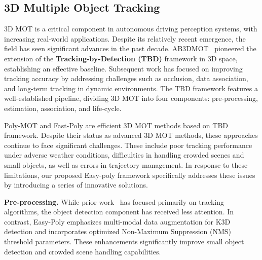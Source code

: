 
\subsection{3D Multiple Object Tracking}

3D MOT is a critical component in autonomous driving perception systems, with increasing real-world applications. Despite its relatively recent emergence, the field has seen significant advances in the past decade. AB3DMOT~\cite{weng20203d} pioneered the extension of the \textbf{Tracking-by-Detection (TBD)} framework in 3D space, establishing an effective baseline. Subsequent work has focused on improving tracking accuracy by addressing challenges such as occlusion, data association, and long-term tracking in dynamic environments. The TBD framework features a well-established pipeline, dividing 3D MOT into four components: pre-processing, estimation, association, and life-cycle.

Poly-MOT and Fast-Poly are efficient 3D MOT methods based on TBD framework. Despite their status as advanced 3D MOT methods, these approaches continue to face significant challenges. These include poor tracking performance under adverse weather conditions, difficulties in handling crowded scenes and small objects, as well as errors in trajectory management. In response to these limitations, our proposed Easy-poly framework specifically addresses these issues by introducing a series of innovative solutions.

\textbf{Pre-processing.}
While prior work~\cite{pang2022simpletrack, li2023poly, li2023camo} has focused primarily on tracking algorithms, the object detection component has received less attention. In contrast, Easy-Poly emphasizes multi-modal data augmentation for K3D detection and incorporates optimized Non-Maximum Suppression (NMS) threshold parameters. These enhancements significantly improve small object detection and crowded scene handling capabilities.

